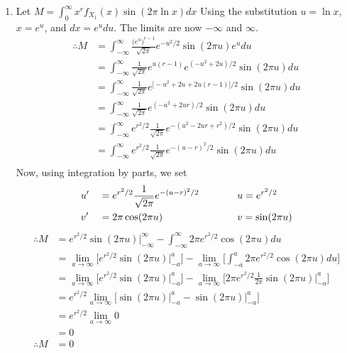 \documentclass[a4paper]{article}
\newcommand{\ds}{\displaystyle}
\begin{document}
\begin{enumerate}
\begin{enumerate}
		\pagebreak

		\item 
		Let $\ds{M = \int^{\infty}_{0}x^rf_{X_1}(x)\sin(2\pi \ln{x})dx}$
		\bigbreak
		Using the substitution $\ds{u = \ln{x}}$, $\ds{x = e^u}$, and $\ds{dx = e^udu}$. The limits are now $\ds{-\infty}$ and $\ds{\infty}$.
		\begin{align*}
			\therefore M & = \int^{\infty}_{-\infty} \frac{\big(e^u \big)^{r-1}}{\sqrt{2\pi}}e^{-u^2/2}\sin(2\pi u)e^udu\\
			& = \int^{\infty}_{-\infty} \frac{1}{\sqrt{2\pi}}e^{u(r-1)}e^{(-u^2 + 2u)/2}\sin(2\pi u)du\\
			& = \int^{\infty}_{-\infty} \frac{1}{\sqrt{2\pi}}e^{\big[-u^2 + 2u + 2u(r-1)\big]/2}\sin(2\pi u)du\\
			& = \int^{\infty}_{-\infty} \frac{1}{\sqrt{2\pi}}e^{(-u^2 + 2ur)/2}\sin(2\pi u)du\\
			& = \int^{\infty}_{-\infty} e^{r^2/2}\frac{1}{\sqrt{2\pi}}e^{-(u^2 - 2ur + r^2)/2}\sin(2\pi u)du\\
			& = \int^{\infty}_{-\infty} e^{r^2/2}\frac{1}{\sqrt{2\pi}}e^{-(u - r)^2/2}\sin(2\pi u)du\\
		\end{align*}
		Now, using integration by parts, we set
		\begin{alignat*}{3}
			&u^{\prime} && = e^{r^2/2}\frac{1}{\sqrt{2\pi}}e^{-(u - r)^2/2} \hspace{10mm} && u = e^{r^2/2}\\
			&v^{\prime} && = 2\pi \cos(2\pi u) \hspace{10mm} && v = \sin(2\pi u)\\
		\end{alignat*}
		\begin{align*}
			\therefore M & = e^{r^2/2}\sin(2\pi u)\Big|^{\infty}_{-\infty} - \int^{\infty}_{-\infty} 2\pi e^{r^2/2} \cos(2\pi u)du\\
			& = \lim_{a\rightarrow \infty}\bigg[e^{r^2/2}\sin(2\pi u)\Big|^{a}_{-a}\bigg] - \lim_{a\rightarrow \infty}\bigg[\int^{a}_{-a} 2\pi e^{r^2/2} \cos(2\pi u)du\bigg]\\
			& = \lim_{a\rightarrow \infty}\bigg[e^{r^2/2}\sin(2\pi u)\Big|^{a}_{-a}\bigg] - \lim_{a\rightarrow \infty}\bigg[2\pi e^{r^2/2} \frac{1}{2\pi}\sin(2\pi u)\Big|^{a}_{-a}\bigg]\\
			& = e^{r^2/2}\lim_{a\rightarrow \infty}\bigg[\sin(2\pi u)\Big|^{a}_{-a} - \sin(2\pi u)\Big|^{a}_{-a}\bigg]\\
			& = e^{r^2/2}\lim_{a\rightarrow \infty}0\\
			& = 0\\
			\therefore M & = 0\\
		\end{align*}


\end{enumerate}
\end{enumerate}
\end{document}
